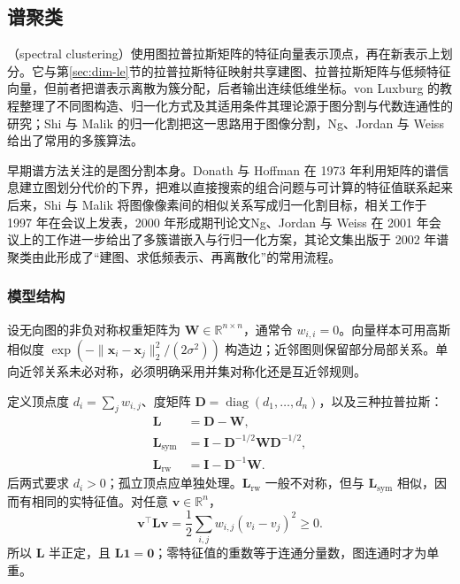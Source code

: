 \subsection{谱聚类}
\label{sec:clustering-spectral}

（spectral clustering）使用图拉普拉斯矩阵的特征向量表示顶点，再在新表示上划分。它与第\ref{sec:dim-le}节的拉普拉斯特征映射共享建图、拉普拉斯矩阵与低频特征向量，但前者把谱表示离散为簇分配，后者输出连续低维坐标。von Luxburg 的教程整理了不同图构造、归一化方式及其适用条件其理论源于图分割与代数连通性的研究；Shi 与 Malik 的归一化割把这一思路用于图像分割，Ng、Jordan 与 Weiss 给出了常用的多簇算法。

早期谱方法关注的是图分割本身。Donath 与 Hoffman 在 1973 年利用矩阵的谱信息建立图划分代价的下界，把难以直接搜索的组合问题与可计算的特征值联系起来后来，Shi 与 Malik 将图像像素间的相似关系写成归一化割目标，相关工作于 1997 年在会议上发表，2000 年形成期刊论文Ng、Jordan 与 Weiss 在 2001 年会议上的工作进一步给出了多簇谱嵌入与行归一化方案，其论文集出版于 2002 年谱聚类由此形成了“建图、求低频表示、再离散化”的常用流程。

\subsubsection{模型结构}

设无向图的非负对称权重矩阵为 $\bm{W}\in\mathbb{R}^{n\times n}$，通常令 $w_{i,i}=0$。向量样本可用高斯相似度 $\exp(-\lVert\bm{x}_i-\bm{x}_j\rVert_2^2/(2\sigma^2))$ 构造边；近邻图则保留部分局部关系。单向近邻关系未必对称，必须明确采用并集对称化还是互近邻规则。

定义顶点度 $d_i=\sum_jw_{i,j}$、度矩阵 $\bm{D}=\operatorname{diag}(d_1,\ldots,d_n)$，以及三种拉普拉斯：
\begin{align}
 \bm{L}&=\bm{D}-\bm{W},\nonumber\\
 \bm{L}_{\mathrm{sym}}
 &=\bm{I}-\bm{D}^{-1/2}\bm{W}\bm{D}^{-1/2},\nonumber\\
 \bm{L}_{\mathrm{rw}}
 &=\bm{I}-\bm{D}^{-1}\bm{W}.
 \label{eq:clustering-laplacians}
\end{align}
后两式要求 $d_i>0$；孤立顶点应单独处理。$\bm{L}_{\mathrm{rw}}$ 一般不对称，但与 $\bm{L}_{\mathrm{sym}}$ 相似，因而有相同的实特征值。对任意 $\bm{v}\in\mathbb{R}^n$，
\begin{equation}
 \bm{v}^{\top}\bm{L}\bm{v}
 =\frac12\sum_{i,j}w_{i,j}(v_i-v_j)^2\geq0.
 \label{eq:clustering-laplacian-form}
\end{equation}
所以 $\bm{L}$ 半正定，且 $\bm{L}\bm{1}=\bm{0}$；零特征值的重数等于连通分量数，图连通时才为单重。

